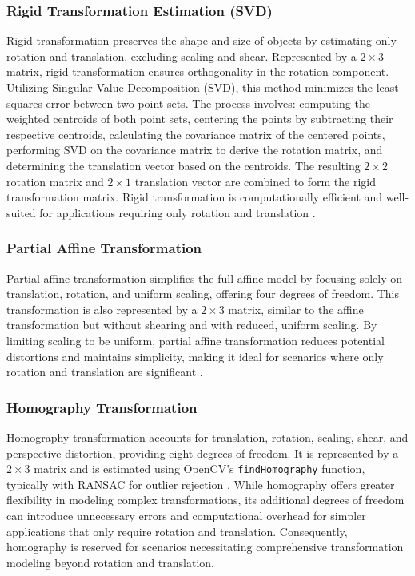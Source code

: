 \subsubsection{Rigid Transformation Estimation (SVD)}

Rigid transformation preserves the shape and size of objects by estimating only rotation and translation, excluding scaling and shear. Represented by a  \(2 \times 3\) matrix, rigid transformation ensures orthogonality in the rotation component. Utilizing Singular Value Decomposition (SVD), this method minimizes the least-squares error between two point sets. The process involves: computing the weighted centroids of both point sets, centering the points by subtracting their respective centroids, calculating the covariance matrix of the centered points, performing SVD on the covariance matrix to derive the rotation matrix, and determining the translation vector based on the centroids. The resulting \(2 \times 2\) rotation matrix and \(2 \times 1\) translation vector are combined to form the rigid transformation matrix. Rigid transformation is computationally efficient and well-suited for applications requiring only rotation and translation \cite{sorkine2017least_squares}.


\subsubsection{Partial Affine Transformation}

Partial affine transformation simplifies the full affine model by focusing solely on translation, rotation, and uniform scaling, offering four degrees of freedom. This transformation is also represented by a \(2 \times 3\) matrix, similar to the affine transformation but without shearing and with reduced, uniform scaling. By limiting scaling to be uniform, partial affine transformation reduces potential distortions and maintains simplicity, making it ideal for scenarios where only rotation and translation are significant \cite{opencv_warp_affine}.

\subsubsection{Homography Transformation}

Homography transformation accounts for translation, rotation, scaling, shear, and perspective distortion, providing eight degrees of freedom. It is represented by a \(2 \times 3\) matrix and is estimated using OpenCV's \texttt{findHomography} function, typically with RANSAC for outlier rejection \cite{opencv_homography}. While homography offers greater flexibility in modeling complex transformations, its additional degrees of freedom can introduce unnecessary errors and computational overhead for simpler applications that only require rotation and translation. Consequently, homography is reserved for scenarios necessitating comprehensive transformation modeling beyond rotation and translation.


